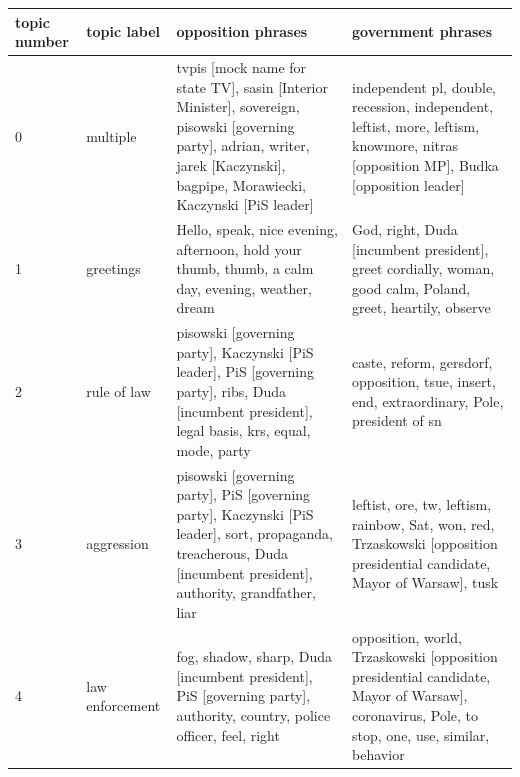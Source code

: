 \documentclass{article}
\begin{document}
\begin{otherlanguage}{polish}
\begin{longtable}{p{2cm}p{2cm}p{5cm}p{5cm}}
	
	\toprule
	topic number &              topic label &                                                                                                                                                                opposition phrases &                                                                                                                                                                               government phrases \\
	\midrule
	0 &                 multiple &  tvpis [mock name for state TV], sasin [Interior Minister], sovereign, pisowski [governing party], adrian, writer, jarek [Kaczynski], bagpipe, Morawiecki, Kaczynski [PiS leader] &                                                              independent pl, double, recession, independent, leftist, more, leftism, knowmore, nitras [opposition MP], Budka [opposition leader] \\
	1 &                greetings &                                                                                Hello, speak, nice evening, afternoon, hold your thumb, thumb, a calm day, evening, weather, dream &                                                                                      God, right, Duda [incumbent president], greet cordially, woman, good calm, Poland, greet, heartily, observe \\
	2 &              rule of law &                                 pisowski [governing party], Kaczynski [PiS leader], PiS [governing party], ribs, Duda [incumbent president], legal basis, krs, equal, mode, party &                                                                                                     caste, reform, gersdorf, opposition, tsue, insert, end, extraordinary, Pole, president of sn \\
	3 &               aggression &                pisowski [governing party], PiS [governing party], Kaczynski [PiS leader], sort, propaganda, treacherous, Duda [incumbent president], authority, grandfather, liar &                                                                        leftist, ore, tw, leftism, rainbow, Sat, won, red, Trzaskowski [opposition presidential candidate, Mayor of Warsaw], tusk \\
	4 &          law enforcement &                                                            fog, shadow, sharp, Duda [incumbent president], PiS [governing party], authority, country, police officer, feel, right &                                                     opposition, world, Trzaskowski [opposition presidential candidate, Mayor of Warsaw], coronavirus, Pole, to stop, one, use, similar, behavior \\

\end{longtable}
\end{otherlanguage}
\end{document}

